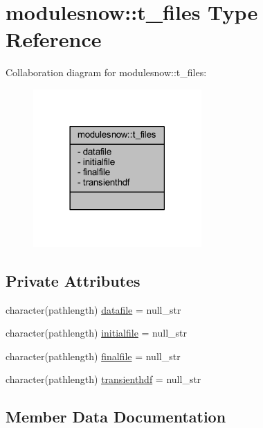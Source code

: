 \hypertarget{structmodulesnow_1_1t__files}{}\section{modulesnow\+:\+:t\+\_\+files Type Reference}
\label{structmodulesnow_1_1t__files}


Collaboration diagram for modulesnow\+:\+:t\+\_\+files\+:\nopagebreak
\begin{figure}[H]
\begin{center}
\leavevmode
\includegraphics[width=182pt]{structmodulesnow_1_1t__files__coll__graph}
\end{center}
\end{figure}
\subsection*{Private Attributes}
\begin{DoxyCompactItemize}
\item 
character(pathlength) \mbox{\hyperlink{structmodulesnow_1_1t__files_aa75d238805b94613a97e2057d8d2ef0c}{datafile}} = null\+\_\+str
\item 
character(pathlength) \mbox{\hyperlink{structmodulesnow_1_1t__files_a9b89cb0c3e15647d8f9f850147deabad}{initialfile}} = null\+\_\+str
\item 
character(pathlength) \mbox{\hyperlink{structmodulesnow_1_1t__files_aed6983383ca823af4a5307776c224ddb}{finalfile}} = null\+\_\+str
\item 
character(pathlength) \mbox{\hyperlink{structmodulesnow_1_1t__files_a1acadcdefbede3de440cd92b6b2f49e8}{transienthdf}} = null\+\_\+str
\end{DoxyCompactItemize}


\subsection{Member Data Documentation}
\mbox{\label{structmodulesnow_1_1t__files_aa75d238805b94613a97e2057d8d2ef0c}} 
